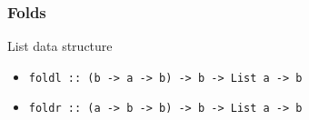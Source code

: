 \begin{frame}
\frametitle{Folds}

\begin{block}{List data structure}



\begin{itemize}
\item \lstinline[basicstyle=\ttfamily]$foldl :: (b -> a -> b) -> b -> List a -> b$
\item \lstinline[basicstyle=\ttfamily]$foldr :: (a -> b -> b) -> b -> List a -> b$
\end{itemize}

\end{block}

\end{frame}
